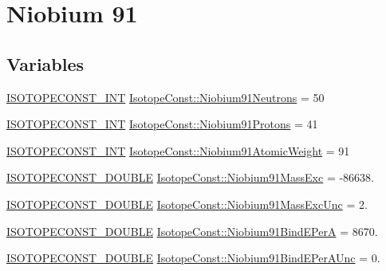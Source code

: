 \hypertarget{group___isotope_const-_niobium-_nb91}{}\section{Niobium 91}
\label{group___isotope_const-_niobium-_nb91}
\subsection*{Variables}
\begin{DoxyCompactItemize}
\item 
\mbox{\hyperlink{group___isotope_const-_macros_ga5f18360b3e99483a35c32d789e62621c}{I\+S\+O\+T\+O\+P\+E\+C\+O\+N\+S\+T\+\_\+\+I\+NT}} \mbox{\hyperlink{group___isotope_const-_niobium-_nb91_ga88da500b9d5f660ec8b7347fa6518f84}{Isotope\+Const\+::\+Niobium91\+Neutrons}} = 50
\item 
\mbox{\hyperlink{group___isotope_const-_macros_ga5f18360b3e99483a35c32d789e62621c}{I\+S\+O\+T\+O\+P\+E\+C\+O\+N\+S\+T\+\_\+\+I\+NT}} \mbox{\hyperlink{group___isotope_const-_niobium-_nb91_ga32aac9d658980f3c5149031f450be3b6}{Isotope\+Const\+::\+Niobium91\+Protons}} = 41
\item 
\mbox{\hyperlink{group___isotope_const-_macros_ga5f18360b3e99483a35c32d789e62621c}{I\+S\+O\+T\+O\+P\+E\+C\+O\+N\+S\+T\+\_\+\+I\+NT}} \mbox{\hyperlink{group___isotope_const-_niobium-_nb91_gac119e910133b8d0a5c9082a9abc3e764}{Isotope\+Const\+::\+Niobium91\+Atomic\+Weight}} = 91
\item 
\mbox{\hyperlink{group___isotope_const-_macros_ga8f45a7272ce02c0b4c65c44636ed719a}{I\+S\+O\+T\+O\+P\+E\+C\+O\+N\+S\+T\+\_\+\+D\+O\+U\+B\+LE}} \mbox{\hyperlink{group___isotope_const-_niobium-_nb91_gad4294df47c1912f92d9124cba68e5edd}{Isotope\+Const\+::\+Niobium91\+Mass\+Exc}} = -\/86638.
\item 
\mbox{\hyperlink{group___isotope_const-_macros_ga8f45a7272ce02c0b4c65c44636ed719a}{I\+S\+O\+T\+O\+P\+E\+C\+O\+N\+S\+T\+\_\+\+D\+O\+U\+B\+LE}} \mbox{\hyperlink{group___isotope_const-_niobium-_nb91_ga56a2497fe047726bbfbafd727b5be4db}{Isotope\+Const\+::\+Niobium91\+Mass\+Exc\+Unc}} = 2.
\item 
\mbox{\hyperlink{group___isotope_const-_macros_ga8f45a7272ce02c0b4c65c44636ed719a}{I\+S\+O\+T\+O\+P\+E\+C\+O\+N\+S\+T\+\_\+\+D\+O\+U\+B\+LE}} \mbox{\hyperlink{group___isotope_const-_niobium-_nb91_ga1edb0cf90819227e8c8d99a0522e9473}{Isotope\+Const\+::\+Niobium91\+Bind\+E\+PerA}} = 8670.
\item 
\mbox{\hyperlink{group___isotope_const-_macros_ga8f45a7272ce02c0b4c65c44636ed719a}{I\+S\+O\+T\+O\+P\+E\+C\+O\+N\+S\+T\+\_\+\+D\+O\+U\+B\+LE}} \mbox{\hyperlink{group___isotope_const-_niobium-_nb91_ga14ef949f4976aacdfaceebe8faf51dee}{Isotope\+Const\+::\+Niobium91\+Bind\+E\+Per\+A\+Unc}} = 0.

\end{DoxyCompactItemize}
